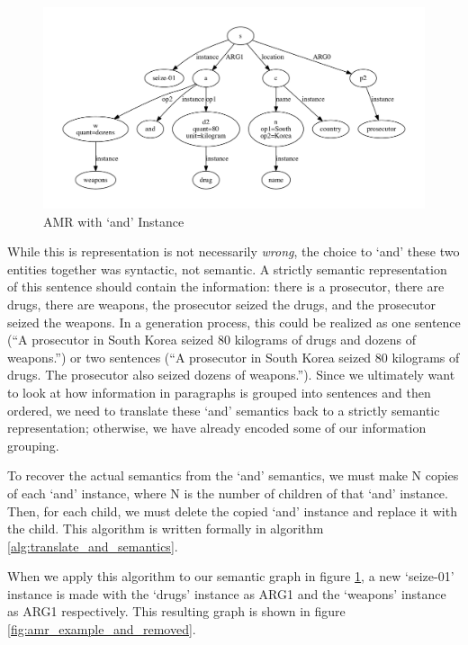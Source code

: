 \documentclass[12pt]{article}
\begin{document}
\begin{figure}
\includegraphics[width=\linewidth]{amr_example_and.pdf}
\caption{AMR with `and' Instance}
\label{fig:amr_example_and}
\end{figure}

While this is representation is not necessarily {\em wrong}, the choice to `and' these two entities together was syntactic, not semantic. A strictly semantic representation of this sentence should contain the information: there is a prosecutor, there are drugs, there are weapons, the prosecutor seized the drugs, and the prosecutor seized the weapons. In a generation process, this could be realized as one sentence (``A prosecutor in South Korea seized 80 kilograms of drugs and dozens of weapons.'') or two sentences (``A prosecutor in South Korea seized 80 kilograms of drugs. The prosecutor also seized dozens of weapons.''). Since we ultimately want to look at how information in paragraphs is grouped into sentences and then ordered, we need to translate these `and' semantics back to a strictly semantic representation; otherwise, we have already encoded some of our information grouping.

To recover the actual semantics from the `and' semantics, we must make N copies of each `and' instance, where N is the number of children of that `and' instance. Then, for each child, we must delete the copied `and' instance and replace it with the child. This algorithm is written formally in algorithm \ref{alg:translate_and_semantics}.

When we apply this algorithm to our semantic graph in figure \ref{fig:amr_example_and}, a new `seize-01' instance is made with the `drugs' instance as ARG1 and the `weapons' instance as ARG1 respectively. This resulting graph is shown in figure \ref{fig:amr_example_and_removed}.
\end{document}
